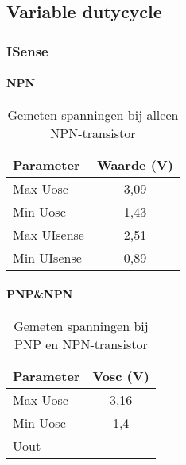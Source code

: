 \subsection{Variable dutycycle}
\subsubsection{ISense}
\paragraph{NPN}
\begin{table}[h!]
\centering
\begin{tabular}{|l|c|}
\hline
\textbf{Parameter} & \textbf{Waarde (V)} \\ \hline
Max Uosc & 3,09 \\ \hline
Min Uosc & 1,43 \\ \hline
Max UIsense & 2,51 \\ \hline
Min UIsense & 0,89 \\ \hline
\end{tabular}
\caption{Gemeten spanningen bij alleen NPN-transistor}
\label{tab:npn_waarden}
\end{table}


\paragraph{PNP\&NPN}
\begin{table}[h!]
\centering
\begin{tabular}{|l|c|}
\hline
\textbf{Parameter} & \textbf{Vosc (V)} \\ \hline
Max Uosc & 3,16 \\ \hline
Min Uosc & 1,4 \\ \hline
Uout & \\ \hline
\end{tabular}
\caption{Gemeten spanningen bij PNP en NPN-transistor}
\label{tab:pnp_npn_waarden}
\end{table}
